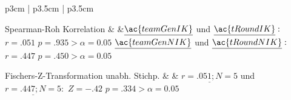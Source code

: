 \documentclass[a4paper,11pt]{article}%
\renewcommand{\\}{\vspace*{0.5\baselineskip} \newline}
\begin{document}
\begin{table}[H]
\begin{tabularx}{\textwidth}{p{3cm} | p{3.5cm} | p{3.5cm}}
		\hline 		
		
%		
		
		Spearman-Roh Korrelation 
		&
		&$\underline{\ac{teamGenIK}}$ und \newline $\underline{\ac{tRoundIK}}:$\newline
		$r=.051$\newline
		$p=.935>\alpha=0.05$\newline
		$\underline{\ac{teamGenNIK}}$ und $\underline{\ac{tRoundNIK}}:$\newline
		$r=.447$\newline
		$p=.450>\alpha=0.05$ \\
		
		\hline 		
		
%		
			
		Fischers-Z-Transformation unabh. Stichp.
		&
		&  $\underline{r=.051; N=5}$ und $\underline{r=.447; N=5} :$\newline
		$Z=-.42$\newline
		$p=.334>\alpha=0.05$ \\
		
		\hline 	
	

\end{tabularx}
\end{table}
\end{document}
